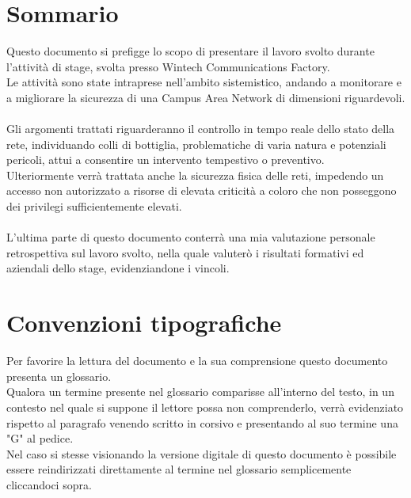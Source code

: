 \documentclass[Tesi.tex]{subfiles}
\begin{document}
\clearpage\thispagestyle{empty}
	
\renewcommand{\chaptername}{}
\renewcommand{\thechapter}{}
\chapter{Sommario}
Questo documento si prefigge lo scopo di presentare il lavoro svolto durante l'attività di stage, svolta presso Wintech Communications Factory. \\
Le attività sono state intraprese nell'ambito sistemistico, andando a monitorare e a migliorare la sicurezza di una Campus Area Network di dimensioni riguardevoli. \\\\

Gli argomenti trattati riguarderanno il controllo in tempo reale dello stato della rete, individuando colli di bottiglia, problematiche di varia natura e potenziali pericoli, attui a consentire un intervento tempestivo o preventivo.\\
Ulteriormente verrà trattata anche la sicurezza fisica delle reti, impedendo un accesso non autorizzato a risorse di elevata criticità a coloro che non posseggono dei privilegi sufficientemente elevati. \\\\

L'ultima parte di questo documento conterrà una mia valutazione personale retrospettiva sul lavoro svolto, nella quale valuterò i risultati formativi ed aziendali dello stage, evidenziandone i vincoli. \\

\newpage
\chapter{Convenzioni tipografiche}
Per favorire la lettura del documento e la sua comprensione questo documento presenta un glossario. \\
Qualora un termine presente nel glossario comparisse all'interno del testo, in un contesto nel quale si suppone il lettore possa non comprenderlo, verrà evidenziato rispetto al paragrafo venendo scritto in corsivo e presentando al suo termine una "G" al pedice. \\
Nel caso si stesse visionando la versione digitale di questo documento è possibile essere reindirizzati direttamente al termine nel glossario semplicemente cliccandoci sopra. \\


\clearpage
\end{document}
